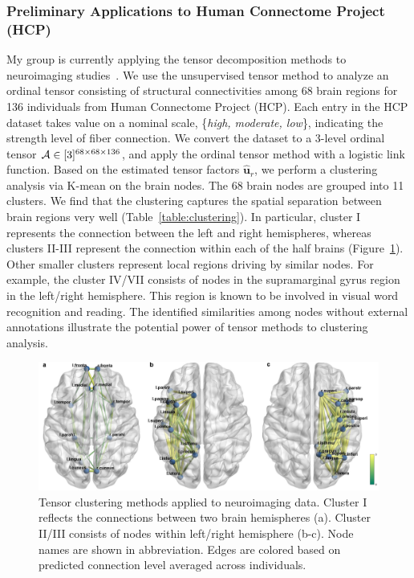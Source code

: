 \documentclass[10pt]{article}
\theoremstyle{definition}
\theoremstyle{definition}
\theoremstyle{definition}
\begin{document}
\begin{enumerate}
\subsubsection{Preliminary Applications to Human Connectome Project (HCP)} 
My group is currently applying the tensor decomposition methods to neuroimaging studies~\cite{geddes2016human}. We use the unsupervised tensor method to analyze an ordinal tensor consisting of structural connectivities among 68 brain regions for 136 individuals from Human Connectome Project (HCP). Each entry in the HCP dataset takes value on a nominal scale, \{{\it high, moderate, low}\}, indicating the strength level of fiber connection. We convert the dataset to a 3-level ordinal tensor $\mathcal{A}\in[3]^{68\times 68\times 136}$, and apply the ordinal tensor method with a logistic link function. Based on the estimated tensor factors $\mathbf{\hat u}_r$, we perform a clustering analysis via K-mean on the brain nodes. The 68 brain nodes are grouped into 11 clusters. We find that the clustering captures the spatial separation between brain regions very well (Table~\ref{table:clustering}). In particular, cluster I represents the connection between the left and right hemispheres, whereas clusters II-III represent the connection within each of the half brains (Figure~\ref{figure:brain image}). Other smaller clusters represent local regions driving by similar nodes. For example, the cluster IV/VII consists of nodes in the supramarginal gyrus region in the left/right hemisphere. This region is known to be involved in visual word recognition and reading. The identified similarities among nodes without external annotations illustrate the potential power of tensor methods to clustering analysis. 


\begin{figure}[ht]
\centering
\includegraphics[width = .7\textwidth]{HCP.pdf}
\caption{Tensor clustering methods applied to neuroimaging data. Cluster I reflects the connections between two brain hemispheres (a). Cluster II/III consists of nodes within left/right hemisphere (b-c). Node names are shown in abbreviation. Edges are colored based on predicted connection level averaged across individuals. }  \label{figure:brain image}
\end{figure}



\end{enumerate}
\end{document}
